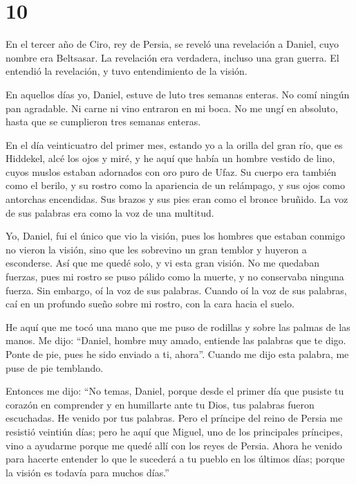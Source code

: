 \hypertarget{section-9}{%
\section{10}\label{section-9}}

 En el tercer año de Ciro, rey de Persia, se reveló una
revelación a Daniel, cuyo nombre era Beltsasar. La revelación era
verdadera, incluso una gran guerra. El entendió la revelación, y tuvo
entendimiento de la visión.

 En aquellos días yo, Daniel, estuve de luto tres semanas
enteras.  No comí ningún pan agradable. Ni carne ni vino
entraron en mi boca. No me ungí en absoluto, hasta que se cumplieron
tres semanas enteras.

 En el día veinticuatro del primer mes, estando yo a la
orilla del gran río, que es Hiddekel,  alcé los ojos y
miré, y he aquí que había un hombre vestido de lino, cuyos muslos
estaban adornados con oro puro de Ufaz.  Su cuerpo era
también como el berilo, y su rostro como la apariencia de un relámpago,
y sus ojos como antorchas encendidas. Sus brazos y sus pies eran como el
bronce bruñido. La voz de sus palabras era como la voz de una multitud.

 Yo, Daniel, fui el único que vio la visión, pues los
hombres que estaban conmigo no vieron la visión, sino que les sobrevino
un gran temblor y huyeron a esconderse.  Así que me quedé
solo, y vi esta gran visión. No me quedaban fuerzas, pues mi rostro se
puso pálido como la muerte, y no conservaba ninguna fuerza.
 Sin embargo, oí la voz de sus palabras. Cuando oí la voz
de sus palabras, caí en un profundo sueño sobre mi rostro, con la cara
hacia el suelo.

 He aquí que me tocó una mano que me puso de rodillas y
sobre las palmas de las manos.  Me dijo: ``Daniel, hombre
muy amado, entiende las palabras que te digo. Ponte de pie, pues he sido
enviado a ti, ahora''. Cuando me dijo esta palabra, me puse de pie
temblando.

 Entonces me dijo: ``No temas, Daniel, porque desde el
primer día que pusiste tu corazón en comprender y en humillarte ante tu
Dios, tus palabras fueron escuchadas. He venido por tus palabras.
 Pero el príncipe del reino de Persia me resistió
veintiún días; pero he aquí que Miguel, uno de los principales
príncipes, vino a ayudarme porque me quedé allí con los reyes de Persia.
 Ahora he venido para hacerte entender lo que le sucederá
a tu pueblo en los últimos días; porque la visión es todavía para muchos
días.''

